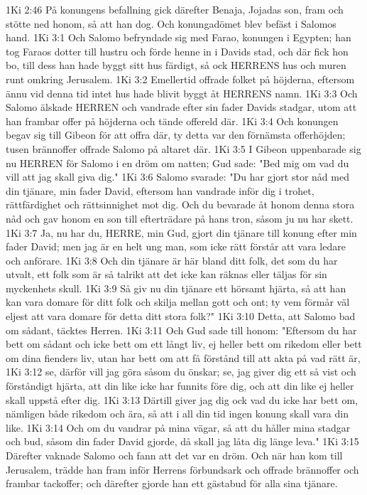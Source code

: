1Ki 2:46  På konungens befallning gick därefter Benaja, Jojadas son, fram och stötte ned honom, så att han dog. Och konungadömet blev befäst i Salomos hand.
1Ki 3:1  Och Salomo befryndade sig med Farao, konungen i Egypten; han tog Faraos dotter till hustru och förde henne in i Davids stad, och där fick hon bo, till dess han hade byggt sitt hus färdigt, så ock HERRENS hus och muren runt omkring Jerusalem.
1Ki 3:2  Emellertid offrade folket på höjderna, eftersom ännu vid denna tid intet hus hade blivit byggt åt HERRENS namn.
1Ki 3:3  Och Salomo älskade HERREN och vandrade efter sin fader Davids stadgar, utom att han frambar offer på höjderna och tände offereld där.
1Ki 3:4  Och konungen begav sig till Gibeon för att offra där, ty detta var den förnämsta offerhöjden; tusen brännoffer offrade Salomo på altaret där.
1Ki 3:5  I Gibeon uppenbarade sig nu HERREN för Salomo i en dröm om natten; Gud sade: "Bed mig om vad du vill att jag skall giva dig."
1Ki 3:6  Salomo svarade: "Du har gjort stor nåd med din tjänare, min fader David, eftersom han vandrade inför dig i trohet, rättfärdighet och rättsinnighet mot dig. Och du bevarade åt honom denna stora nåd och gav honom en son till efterträdare på hans tron, såsom ju nu har skett.
1Ki 3:7  Ja, nu har du, HERRE, min Gud, gjort din tjänare till konung efter min fader David; men jag är en helt ung man, som icke rätt förstår att vara ledare och anförare.
1Ki 3:8  Och din tjänare är här bland ditt folk, det som du har utvalt, ett folk som är så talrikt att det icke kan räknas eller täljas för sin myckenhets skull.
1Ki 3:9  Så giv nu din tjänare ett hörsamt hjärta, så att han kan vara domare för ditt folk och skilja mellan gott och ont; ty vem förmår väl eljest att vara domare för detta ditt stora folk?"
1Ki 3:10  Detta, att Salomo bad om sådant, täcktes Herren.
1Ki 3:11  Och Gud sade till honom: "Eftersom du har bett om sådant och icke bett om ett långt liv, ej heller bett om rikedom eller bett om dina fienders liv, utan har bett om att få förstånd till att akta på vad rätt är,
1Ki 3:12  se, därför vill jag göra såsom du önskar; se, jag giver dig ett så vist och förståndigt hjärta, att din like icke har funnits före dig, och att din like ej heller skall uppstå efter dig.
1Ki 3:13  Därtill giver jag dig ock vad du icke har bett om, nämligen både rikedom och ära, så att i all din tid ingen konung skall vara din like.
1Ki 3:14  Och om du vandrar på mina vägar, så att du håller mina stadgar och bud, såsom din fader David gjorde, då skall jag låta dig länge leva."
1Ki 3:15  Därefter vaknade Salomo och fann att det var en dröm. Och när han kom till Jerusalem, trädde han fram inför Herrens förbundsark och offrade brännoffer och frambar tackoffer; och därefter gjorde han ett gästabud för alla sina tjänare.
